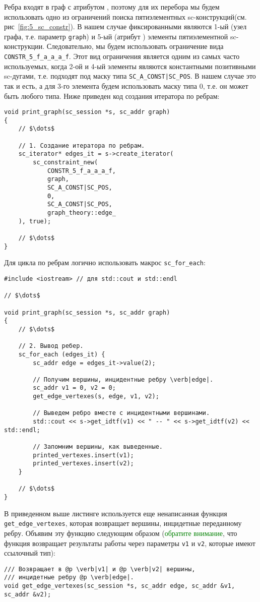 Ребра входят в граф с атрибутом , поэтому для их
перебора мы будем использовать одно из ограничений поиска
пятиэлементных sc-конструкций(см. рис~\ref{fig:5_sc_constr}). В нашем
случае фиксированными являются 1-ый (узел графа, т.е. параметр
\lstinline|graph|) и 5-ый (атрибут ) элементы
пятиэлементной sc-конструкции. Следовательно, мы будем использовать
ограничение вида \lstinline|CONSTR_5_f_a_a_a_f|. Этот вид ограничения
является одним из самых часто используемых, когда 2-ой и 4-ый элементы
являются константными позитивными sc-дугами, т.е. подходят под маску
типа \lstinline+SC_A_CONST|SC_POS+. В нашем случае это так и есть, а
для 3-го элемента будем использовать маску типа 0, т.е. он может быть
любого типа. Ниже приведен код создания итератора по ребрам:
\begin{lstlisting}[texcl]
void print_graph(sc_session *s, sc_addr graph)
{
    // $\dots$

    // 1. Создание итератора по ребрам.
    sc_iterator* edges_it = s->create_iterator(
        sc_constraint_new(
            CONSTR_5_f_a_a_a_f,
            graph,
            SC_A_CONST|SC_POS,
            0,
            SC_A_CONST|SC_POS,
            graph_theory::edge_
    ), true);

    // $\dots$
}
\end{lstlisting}

Для цикла по ребрам логично использовать макрос
\lstinline|sc_for_each|:
\begin{lstlisting}[texcl]
#include <iostream> // для std::cout и std::endl

// $\dots$

void print_graph(sc_session *s, sc_addr graph)
{
    // $\dots$

    // 2. Вывод ребер.
    sc_for_each (edges_it) {
        sc_addr edge = edges_it->value(2);

        // Получим вершины, инцидентные ребру \verb|edge|.
        sc_addr v1 = 0, v2 = 0;
        get_edge_vertexes(s, edge, v1, v2);

        // Выведем ребро вместе с инцидентными вершинами.
        std::cout << s->get_idtf(v1) << " -- " << s->get_idtf(v2) << std::endl;

        // Запомним вершины, как выведенные.
        printed_vertexes.insert(v1);
        printed_vertexes.insert(v2);
    }

    // $\dots$
}
\end{lstlisting}

В приведенном выше листинге используется еще ненаписанная функция
\lstinline|get_edge_vertexes|, которая возвращает вершины, инцидетные
переданному ребру. Объявим эту функцию следующим образом
(\textcolor{green}{обратите внимание}, что функция возвращает результаты
работы через параметры \lstinline|v1| и \lstinline|v2|, которые имеют
ссылочный тип):
\begin{lstlisting}[texcl]
/// Возвращает в @p \verb|v1| и @p \verb|v2| вершины,
/// инцидетные ребру @p \verb|edge|.
void get_edge_vertexes(sc_session *s, sc_addr edge, sc_addr &v1, sc_addr &v2);
\end{lstlisting}

